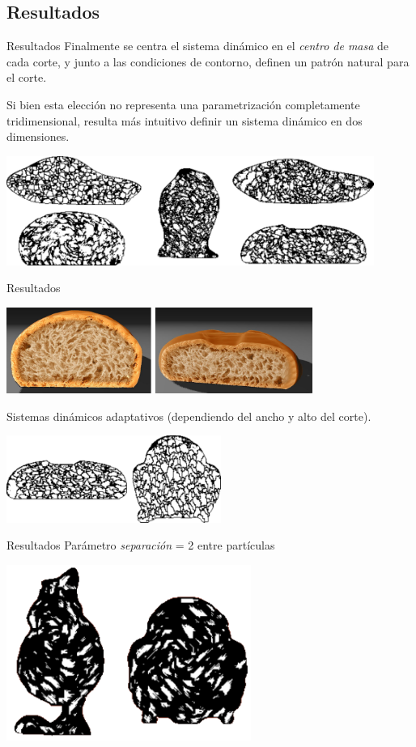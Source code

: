 \documentclass[spanish]{beamer}
\begin{document}
\subsection{Resultados}

\begin{frame}{Resultados}
Finalmente se centra el sistema dinámico en el {\em centro de masa} de cada corte, y junto a las condiciones de contorno, definen un patrón natural para el corte.

Si bien esta elección no representa una parametrización completamente tridimensional, resulta más intuitivo definir un sistema dinámico en dos dimensiones.

\includegraphics[width=12cm]{../figures/Fig5}
\end{frame}

\begin{frame}{Resultados}
\centerline{\includegraphics[width=10cm]{../figures/Fig11CAVW}}


Sistemas dinámicos adaptativos (dependiendo del ancho y alto del corte).

\centerline{\includegraphics[width=7cm]{../figures/Fig6}}

\end{frame}

\begin{frame}{Resultados}
Parámetro {\em separación} = 2 entre partículas

\centerline{\includegraphics[width=8cm]{../figures/Fig7}}
\end{frame}
\end{document}
